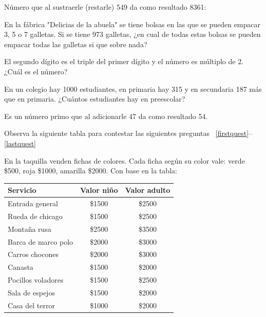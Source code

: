 \documentclass[10pt,letterpaper,addpoints]{exam}
\begin{document}
\begin{questions}
\question
Número que al sustraerle (restarle) 549 da como resultado 8361:

\begin{oneparchoices}
\end{oneparchoices}
\question
En la fábrica "Delicias de la abuela" se tiene bolsas en las que se pueden empacar 3, 5 o 7 galletas. Si se tiene 973 galletas, ¿en cual de todas estas bolsas se pueden empacar todas las galletas si que sobre nada?

\begin{oneparchoices}
\end{oneparchoices}
\question
El segundo dígito es el triple del primer dígito y el número es múltiplo de 2. ¿Cuál es el número?

\begin{oneparchoices}
\end{oneparchoices}
\question 
En un colegio hay 1000 estudiantes, en primaria hay 315 y en secundaria 187 más que en primaria. ¿Cuántos estudiantes hay en preescolar?

\begin{oneparchoices}
\end{oneparchoices}
\question
Es un n\'umero primo que al adicionarle 47 da como resultado 54.

\begin{oneparchoices}
\end{oneparchoices}

\begin{minipage}{.4\textwidth}{Observa la siguiente tabla para contestar las siguientes preguntas ~\ref{firstquest}--\ref{lastquest}

En la taquilla venden fichas de colores. Cada ficha según su color vale: verde \$500, roja \$1000, amarilla \$2000. Con base en la tabla:}
\end{minipage}\hfill
\begin{minipage}{.5\textwidth}{
\begin{tabular}{|l|c|c|}
\hline 
Servicio & Valor niño & Valor adulto \\ 
\hline 
Entrada general & \$1500 & \$2500 \\ 
\hline 
Rueda de chicago & \$1500 & \$2500 \\ 
\hline 
Montaña rusa & \$2500 & \$3500 \\ 
\hline 
Barca de marco polo & \$2000 & \$3000 \\ 
\hline 
Carros chocones & \$2000 & \$3000 \\ 
\hline 
Canasta & \$1500 & \$2000 \\ 
\hline 
Pocillos voladores & \$1500 & \$2500 \\ 
\hline 
Sala de espejos & \$1500 & \$2000 \\ 
\hline 
Casa del terror & \$1000 & \$2000 \\ 
\hline 
\end{tabular}}
\end{minipage}



\end{questions}
\end{document}

